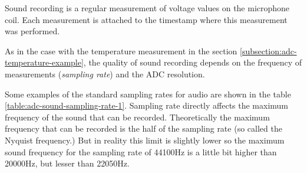 \documentclass[../sparc.tex]{subfiles}
\begin{document}
Sound recording is a regular measurement of voltage values on the microphone
coil.  Each measurement is attached to the timestamp where this measurement was
performed.

As in the case with the temperature measurement in the section
\ref{subsection:adc-temperature-example}, the quality of sound recording depends
on the frequency of measurements (\emph{sampling rate}) and the ADC resolution.

Some examples of the standard sampling rates for audio are shown in the table
\ref{table:adc-sound-sampling-rate-1}.  Sampling rate directly affects the
maximum frequency of the sound that can be recorded.  Theoretically the maximum
frequency that can be recorded is the half of the sampling rate (so called the
Nyquist frequency.)  But in reality this limit is slightly lower so the maximum
sound frequency for the sampling rate of 44100Hz is a little bit higher than
20000Hz, but lesser than 22050Hz. \cite{audacityteam:sample-rates}
\end{document}
